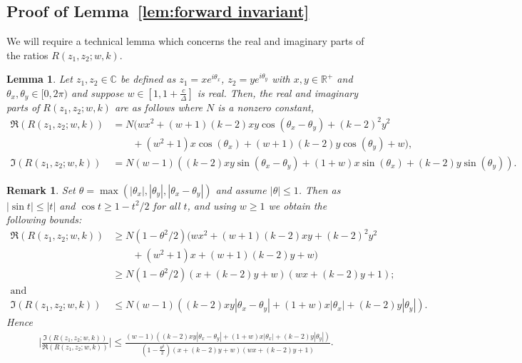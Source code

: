 \documentclass[10pt,a4paper]{article}
\newtheorem{lemma}[theorem]{Lemma}
\newtheorem{remark}[theorem]{Remark}
\theoremstyle{definition}
\newcommand*{\CC}{\mathbb{C}}
\newcommand*{\RR}{\mathbb{R}}
\newcommand{\thx}{\theta_x}
\newcommand{\thy}{\theta_y}
\begin{document}
\subsection{Proof of Lemma~\ref{lem:forward invariant}}
\label{sec:boundcalpha}
%
We will require a technical lemma which concerns the real and imaginary parts of the ratios $R(z_1,z_2;w,k)$.
%
\begin{lemma}
\label{lem:reimparts}
 Let $z_1, z_2 \in \CC$ be defined as $z_1 = xe^{i\thx}$, $z_2 = ye^{i\thy}$ with $x,y \in \RR^+$ and $\thx,\thy \in [0,2\pi)$ and suppose $w \in[1, 1 + \frac{c}{\Delta}]$ is real.
 Then, the real and imaginary parts of $R(z_1,z_2;w,k)$ are as follows where $N$ is a nonzero constant,
 \begin{align}
 \label{eq:realR} \Re(R(z_1,z_2;w,k)) &= N(wx^2+(w+1)(k-2)xy\cos(\thx-\thy) +(k-2)^2y^2 \\ &\qquad+(w^2+1)x\cos(\thx)+(w+1)(k-2)y\cos(\thy) +w), \nonumber\\
 \label{eq:imagR} \Im(R(z_1,z_2;w,k)) &= N (w-1)((k-2)xy\sin(\thx-\thy) +(1+w)x\sin(\thx) +(k-2)y\sin(\thy)).
 \end{align}
\end{lemma}
\begin{remark} 
\label{rem:reimparts}
%
Set $\theta =\max(|\thx|,|\thy|, |\thx-\thy|)$ and assume $|\theta| \le 1$. Then as $|\sin t| \leq |t|$ and $\cos t \geq 1 - t^2/2$ for all $t$, and using $w \geq 1$ we obtain the following bounds:
 \begin{align*}
 \Re(R(z_1,z_2;w,k))  
 &\ge N(1 - \theta^2/2)(wx^2 + (w+1)(k-2)xy +(k-2)^2y^2  \\
&\qquad +(w^2+1)x +(w+1)(k-2)y +w) \\
 &\ge N(1 - \theta^2/2)(x+(k-2)y+w)(wx+(k-2)y+1);\\
 \text{and}\\
  \Im(R(z_1,z_2;w,k)) & \le N (w-1)((k-2)xy|\thx-\thy| +(1+w)x|\thx| +(k-2)y|\thy|).
 \end{align*} 
Hence
\begin{align}
 \bigg|\frac{\Im(R(z_1,z_2;w,k))}{\Re(R(z_1,z_2;w,k))}\bigg| \leq
 \frac{(w-1)\left((k-2)xy|\thx-\thy|+(1+w)x|\thx|+(k-2)y|\thy|\right)}
 {(1 - \frac{\theta^2}{2})(x+(k-2)y+w)(wx+(k-2)y+1)}. 
\label{eq:imreratio}
 \end{align}
\end{remark}
%
\end{document}
